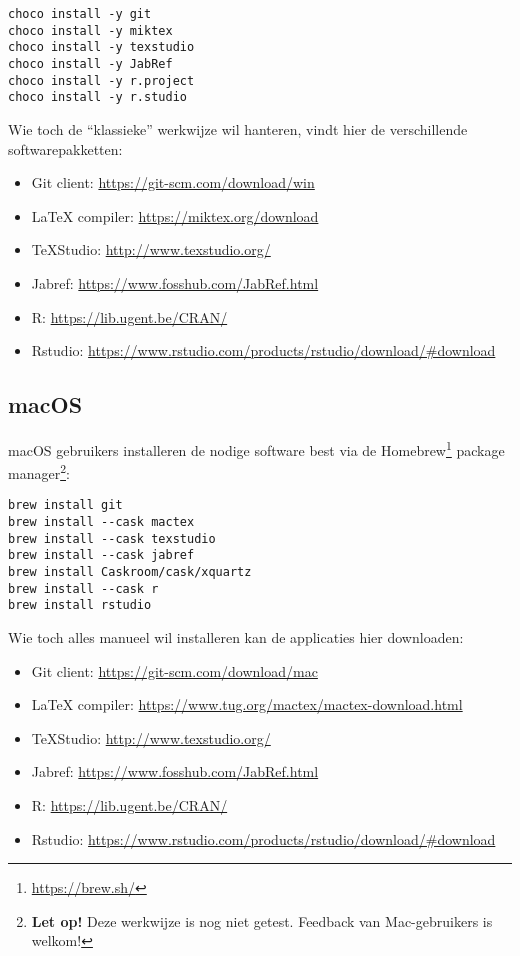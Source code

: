 \begin{verbatim}
choco install -y git
choco install -y miktex
choco install -y texstudio
choco install -y JabRef
choco install -y r.project
choco install -y r.studio
\end{verbatim}

Wie toch de ``klassieke'' werkwijze wil hanteren, vindt hier de verschillende softwarepakketten:

\begin{itemize}
  \item Git client: \url{https://git-scm.com/download/win}
  \item \LaTeX{} compiler: \url{https://miktex.org/download}
  \item TeXStudio: \url{http://www.texstudio.org/}
  \item Jabref: \url{https://www.fosshub.com/JabRef.html}
  \item R: \url{https://lib.ugent.be/CRAN/}
  \item Rstudio: \url{https://www.rstudio.com/products/rstudio/download/#download}
\end{itemize}

\subsection{macOS}

macOS gebruikers installeren de nodige software best via de Homebrew\footnote{\url{https://brew.sh/}} package manager\footnote{\textbf{Let op!} Deze werkwijze is nog niet getest. Feedback van Mac-gebruikers is welkom!}:

\begin{verbatim}
brew install git
brew install --cask mactex
brew install --cask texstudio
brew install --cask jabref
brew install Caskroom/cask/xquartz
brew install --cask r
brew install rstudio
\end{verbatim}

Wie toch alles manueel wil installeren kan de applicaties hier downloaden:

\begin{itemize}
  \item Git client: \url{https://git-scm.com/download/mac}
  \item \LaTeX{} compiler: \url{https://www.tug.org/mactex/mactex-download.html}
  \item TeXStudio: \url{http://www.texstudio.org/}
  \item Jabref: \url{https://www.fosshub.com/JabRef.html}
  \item R: \url{https://lib.ugent.be/CRAN/}
  \item Rstudio: \url{https://www.rstudio.com/products/rstudio/download/#download}
\end{itemize}

